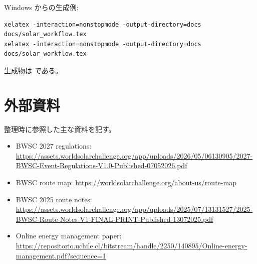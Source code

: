 \documentclass[a4paper,11pt]{article}
\begin{document}
Windows からの生成例:

\begin{Verbatim}[fontsize=\small]
xelatex -interaction=nonstopmode -output-directory=docs docs/solar_workflow.tex
xelatex -interaction=nonstopmode -output-directory=docs docs/solar_workflow.tex
\end{Verbatim}

生成物は  である。

\section{外部資料}

整理時に参照した主な資料を記す。

\begin{itemize}
  \item BWSC 2027 regulations:
  \url{https://assets.worldsolarchallenge.org/app/uploads/2026/05/06130905/2027-BWSC-Event-Regulations-V1.0-Published-07052026.pdf}
  \item BWSC route map:
  \url{https://worldsolarchallenge.org/about-us/route-map}
  \item BWSC 2025 route notes:
  \url{https://assets.worldsolarchallenge.org/app/uploads/2025/07/13131527/2025-BWSC-Route-Notes-V1-FINAL-PRINT-Published-13072025.pdf}
  \item Online energy management paper:
  \url{https://repositorio.uchile.cl/bitstream/handle/2250/140895/Online-energy-management.pdf?sequence=1}
\end{itemize}
\end{document}
